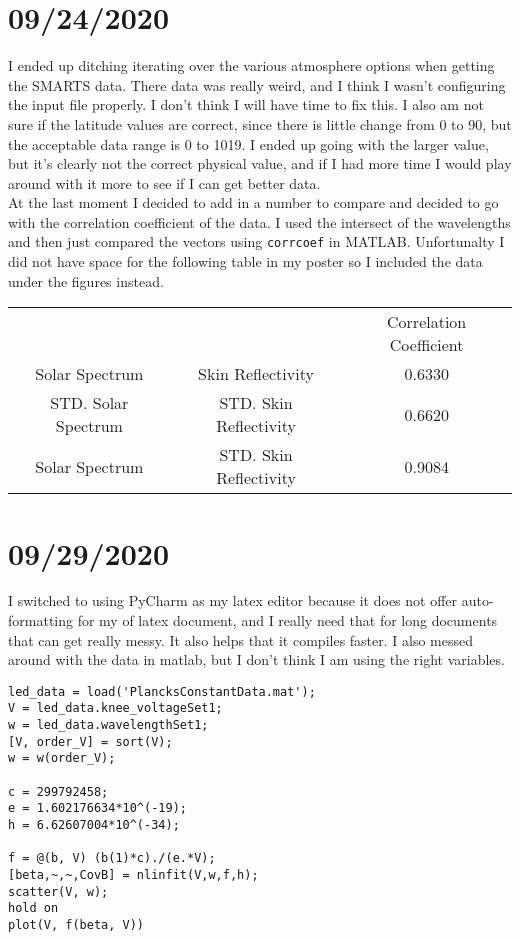 \documentclass{article}
\begin{document}
    \section*{09/24/2020}
    I ended up ditching iterating over the various atmosphere options when getting the SMARTS data. There data was really weird, and I think I wasn't configuring the input file properly. I don't think I will have time to fix this. I also am not sure if the latitude values are correct, since there is little change from 0 to 90, but the acceptable data range is 0 to 1019. I ended up going with the larger value, but it's clearly not the correct physical value, and if I had more time I would play around with it more to see if I can get better data.\\
    At the last moment I decided to add in a number to compare and decided to go with the correlation coefficient of the data. I used the intersect of the wavelengths and then just compared the vectors using \texttt{corrcoef} in MATLAB. Unfortunalty I did not have space for the following table in my poster so I included the data under the figures instead.
    \begin{tabular}{c|c|c}
        &                        & Correlation Coefficient \\
        Solar Spectrum      & Skin Reflectivity      & 0.6330                  \\
        STD. Solar Spectrum & STD. Skin Reflectivity & 0.6620                  \\
        Solar Spectrum      & STD. Skin Reflectivity & 0.9084
    \end{tabular}
    \section*{09/29/2020}
    I switched to using PyCharm as my latex editor because it does not offer auto-formatting for my of latex document, and I really need that for long documents that can get really messy. It also helps that it compiles faster. I also messed around with the data in matlab, but I don't think I am using the right variables.
    \begin{lstlisting}
led_data = load('PlancksConstantData.mat');
V = led_data.knee_voltageSet1;
w = led_data.wavelengthSet1;
[V, order_V] = sort(V);
w = w(order_V);

c = 299792458;
e = 1.602176634*10^(-19);
h = 6.62607004*10^(-34);

f = @(b, V) (b(1)*c)./(e.*V);
[beta,~,~,CovB] = nlinfit(V,w,f,h);
scatter(V, w);
hold on
plot(V, f(beta, V))
    \end{lstlisting}
\end{document}
